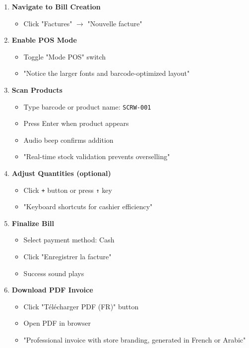\begin{enumerate}
    \item \textbf{Navigate to Bill Creation}
    \begin{itemize}
        \item Click "Factures" $\rightarrow$ "Nouvelle facture"
    \end{itemize}
    
    \item \textbf{Enable POS Mode}
    \begin{itemize}
        \item Toggle "Mode POS" switch
        \item "Notice the larger fonts and barcode-optimized layout"
    \end{itemize}
    
    \item \textbf{Scan Products}
    \begin{itemize}
        \item Type barcode or product name: \texttt{SCRW-001}
        \item Press Enter when product appears
        \item Audio beep confirms addition
        \item "Real-time stock validation prevents overselling"
    \end{itemize}
    
    \item \textbf{Adjust Quantities (optional)}
    \begin{itemize}
        \item Click \texttt{+} button or press \texttt{↑} key
        \item "Keyboard shortcuts for cashier efficiency"
    \end{itemize}
    
    \item \textbf{Finalize Bill}
    \begin{itemize}
        \item Select payment method: Cash
        \item Click "Enregistrer la facture"
        \item Success sound plays
    \end{itemize}
    
    \item \textbf{Download PDF Invoice}
    \begin{itemize}
        \item Click "Télécharger PDF (FR)" button
        \item Open PDF in browser
        \item "Professional invoice with store branding, generated in French or Arabic"
    \end{itemize}
\end{enumerate}

